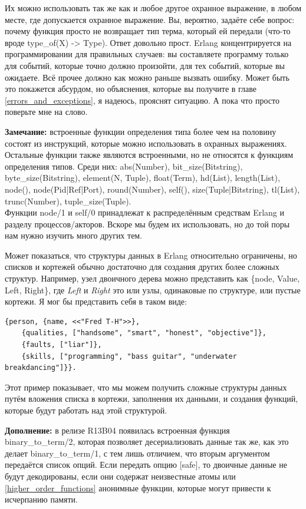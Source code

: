 \documentclass[a4paper,12pt]{report}
\newcommand{\ops}{\colorbox{lgreen}}
\begin{document}
Их можно использовать так же как и любое другое охранное выражение, в любом месте, где допускается охранное выражение. Вы, вероятно, задаёте себе вопрос: почему функция просто не возвращает тип терма, который ей передали (что\--то вроде \ops{type\_of(X) -> Type}). Ответ довольно прост. Erlang концентрируется на программировании для правильных случаев: вы составляете программу только для событий, которые точно должно произойти, для тех событий, которые вы ожидаете. Всё прочее должно как можно раньше вызвать ошибку. Может быть это покажется абсурдом, но объяснения, которые вы получите в главе \ref{errors_and_exceptions}, я надеюсь, прояснят ситуацию. А пока что просто поверьте мне на слово.\\
\colorbox{lgray}
{
    \begin{minipage}{\linewidth}
\textbf{Замечание:} встроенные функции определения типа более чем на половину состоят из инструкций, которые можно использовать в охранных выражениях. Остальные функции также являются встроенными, но не относятся к функциям определения типов. Среди них: \ops{abs(Number), bit\_size(Bitstring), byte\_size(Bitstring),}
\ops{element(N, Tuple), float(Term), hd(List), length(List),}
\ops{node(), node(Pid|Ref|Port), round(Number), self(),}
\ops{size(Tuple|Bitstring), tl(List), trunc(Number), tuple\_size(Tuple).}\\
Функции \ops{node/1} и \ops{self/0} принадлежат к распределённым средствам Erlang и разделу процессов/акторов. Вскоре мы будем их использовать, но до той поры нам нужно изучить много других тем.
    \end{minipage}
}

Может показаться, что структуры данных в Erlang относительно ограничены, но списков и кортежей обычно достаточно для создания других более сложных структур. Например, узел двоичного дерева можно представить как \ops{\{node, Value, Left, Right\}}, где \emph{Left} и \emph{Right} это или узлы, одинаковые по структуре, или пустые кортежи. Я мог бы представить себя в таком виде:
\begin{lstlisting}[style=erlang]
{person, {name, <<"Fred T-H">>},
    {qualities, ["handsome", "smart", "honest", "objective"]},
    {faults, ["liar"]},
    {skills, ["programming", "bass guitar", "underwater breakdancing"]}}.
\end{lstlisting}

Этот пример показывает, что мы можем получить сложные структуры данных путём вложения списка в кортежи, заполнения их данными, и создания функций, которые будут работать над этой структурой.\\
\colorbox{lgray}
{
    \begin{minipage}{\linewidth}
\textbf{Дополнение:} в релизе R13B04 появилась встроенная функция \ops{binary\_to\_term/2}, которая позволяет десериализовать данные так же, как это делает \ops{binary\_to\_term/1}, с тем лишь отличием, что вторым аргументом передаётся список опций. Если передать опцию \ops{[safe]}, то двоичные данные не будут декодированы, если они содержат неизвестные атомы или \ref{higher_order_functions} анонимные функции, которые могут привести к исчерпанию памяти.
    \end{minipage}
}
\end{document}
